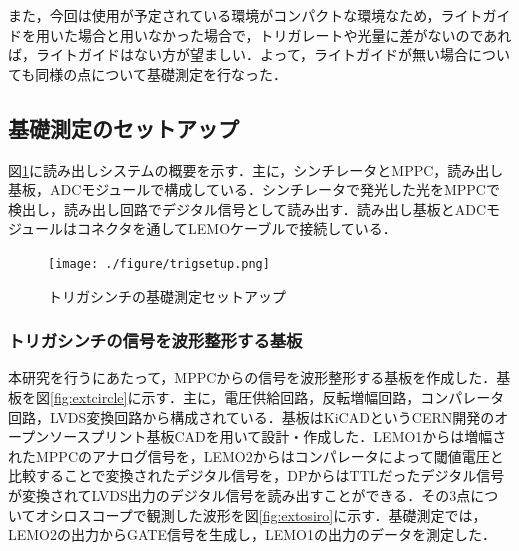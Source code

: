 また，今回は使用が予定されている環境がコンパクトな環境なため，ライトガイドを用いた場合と用いなかった場合で，トリガレートや光量に差がないのであれば，ライトガイドはない方が望ましい．よって，ライトガイドが無い場合についても同様の点について基礎測定を行なった．

\subsection{基礎測定のセットアップ}
図\ref{fig:trigsetup}に読み出しシステムの概要を示す．主に，シンチレータとMPPC，読み出し基板，ADCモジュールで構成している．シンチレータで発光した光をMPPCで検出し，読み出し回路でデジタル信号として読み出す．読み出し基板とADCモジュールはコネクタを通してLEMOケーブルで接続している．

\begin{figure}[h]
  \centering
  \texttt{[image: ./figure/trigsetup.png]}
  \caption{トリガシンチの基礎測定セットアップ}
  \label{fig:trigsetup}
\end{figure}

\subsubsection*{トリガシンチの信号を波形整形する基板}
本研究を行うにあたって，MPPCからの信号を波形整形する基板を作成した．基板を図\ref{fig:extcircle}に示す．主に，電圧供給回路，反転増幅回路，コンパレータ回路，LVDS変換回路から構成されている．基板はKiCADというCERN開発のオープンソースプリント基板CADを用いて設計・作成した．LEMO1からは増幅されたMPPCのアナログ信号を，LEMO2からはコンパレータによって閾値電圧と比較することで変換されたデジタル信号を，DPからはTTLだったデジタル信号が変換されてLVDS出力のデジタル信号を読み出すことができる．その3点についてオシロスコープで観測した波形を図\ref{fig:extosiro}に示す．基礎測定では，LEMO2の出力からGATE信号を生成し，LEMO1の出力のデータを測定した．

